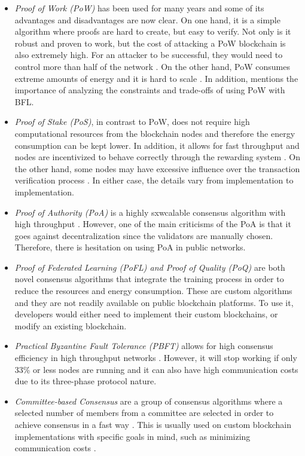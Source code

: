 \begin{itemize}
    \item \textit{Proof of Work (PoW)} has been used for many years and some of its advantages and disadvantages are now clear. On one hand, it is a simple algorithm where proofs are hard to create, but easy to verify. Not only is it robust and proven to work, but the cost of attacking a PoW blockchain is also extremely high. For an attacker to be successful, they would need to control more than half of the network \cite{li_blockchain_2021}. On the other hand, PoW consumes extreme amounts of energy and it is hard to scale \cite{edwood_2020, li_blockchain_2021, ccaf}. In addition, \cite{10.48550/arxiv.2112.07938} mentions the importance of analyzing the constraints and trade-offs of using PoW with BFL.

    \item \textit{Proof of Stake (PoS)}, in contrast to PoW, does not require high computational resources from the blockchain nodes and therefore the energy consumption can be kept lower. In addition, it allows for fast throughput and nodes are incentivized to behave correctly through the rewarding system \cite{li_blockchain_2021}. On the other hand, some nodes may have excessive influence over the transaction verification process \cite{li_blockchain_2021}. In either case, the details vary from implementation to implementation.
    
    \item \textit{Proof of Authority (PoA)} is a highly sxwcalable consensus algorithm with high throughput \cite{binance_academy_2020}. However, one of the main criticisms of the PoA is that it goes against decentralization since the validators are manually chosen. Therefore, there is hesitation on using PoA in public networks.

    \item \textit{Proof of Federated Learning (PoFL) \cite{9347812, 10.48550/arxiv.2007.15145} and Proof of Quality (PoQ)} \cite{8843900} are both novel consensus algorithms that integrate the training process in order to reduce the resources and energy consumption. These are custom algorithms and they are not readily available on public blockchain platforms. To use it, developers would either need to implement their custom blockchains, or modify an existing blockchain.

    \item \textit{Practical Byzantine Fault Tolerance (PBFT)} allows for high consensus efficiency in high throughput networks \cite{li_blockchain_2021}. However, it will stop working if only 33\% or less nodes are running and it can also have high communication costs due to its three-phase protocol nature.

    \item \textit{Committee-based Consensus} are a group of consensus algorithms where a selected number of members from a committee are selected in order to achieve consensus in a fast way \cite{qu_blockchain-enabled_2022}. This is usually used on custom blockchain implementations with specific goals in mind, such as minimizing communication costs \cite{9293091}.
\end{itemize}

